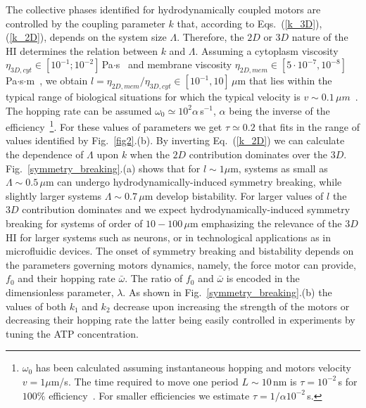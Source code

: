 \documentclass[prl,aps,twocolumn, floatfix, superscriptaddress,showpacs]{revtex4}
\begin{document}
The collective phases identified for hydrodynamically coupled motors are controlled  by the coupling parameter $k$ that, according to Eqs.~(\ref{k_3D}),(\ref{k_2D}), depends on the system size $\Lambda$. Therefore, the $2D$ or $3D$ nature of the HI determines the relation between $k$ and $\Lambda$.  
Assuming a cytoplasm viscosity $\eta_{3D,cyt} \in [10^{-1};10^{-2}]\, $Pa$\cdot$s~\cite{Margraves} and membrane
viscosity  $\eta_{2D,mem} \in [5\cdot10^{-7},10^{-8}]\,$ Pa$\cdot$s$\cdot$m~\cite{Cicuta}, we obtain $l=\eta_{2D,mem}/\eta_{3D,cyt} \in [10^{-1},10] \,
\mu$m that lies within the typical range of biological situations 
for which the typical velocity is $v \sim 0.1\, \mu m$~\cite{Campas-joanny}. The hopping rate can be assumed  $\omega_0\simeq 10^2 \alpha\,$s$^{-1}$,  $\alpha$ being the inverse of the efficiency~\footnote{$\omega_0$ has been calculated  assuming  instantaneous hopping  and motors  velocity  $v=1\mu$m/s. The time required to move one period $L\sim10\, $nm is $\tau=10^{-2}\, $s for $100 \%$ efficiency~\cite{Julicher1995}. For smaller efficiencies we estimate $\tau=1/\alpha10^{-2}\, $s.}.
For these values of parameters we get $\tau\simeq 0.2$ that fits in the range of values identified by Fig.~\ref{fig2}.(b).
By inverting Eq.~(\ref{k_2D}) we can calculate the dependence of $\Lambda$ upon $k$ when the $2D$ contribution dominates over the $3D$. Fig.~\ref{symmetry_breaking}.(a) shows that for $l \sim 1\mu$m, systems as small as $\Lambda \sim 0.5\, \mu$m can undergo hydrodynamically-induced symmetry breaking, while slightly larger systems $\Lambda \sim 0.7\, \mu$m  develop bistability. For larger values of $l$ the $3D$ contribution dominates and we expect hydrodynamically-induced symmetry breaking for systems of  order of $10-100\, \mu$m emphasizing the relevance of the $3D$ HI for larger systems such as neurons, or in technological applications as in microfluidic devices.
The onset of symmetry breaking and bistability depends on the parameters governing motors dynamics, namely, the force motor can provide, $f_0$ and their hopping rate $\bar\omega$. The ratio of $f_0$ and $\bar\omega$ is encoded in the dimensionless parameter, $\lambda$. As shown in Fig.~\ref{symmetry_breaking}.(b) the values of both $k_1$ and $k_2$ decrease upon increasing the strength of the motors or decreasing their hopping rate the latter being easily controlled in experiments by tuning the ATP concentration.
\end{document}
